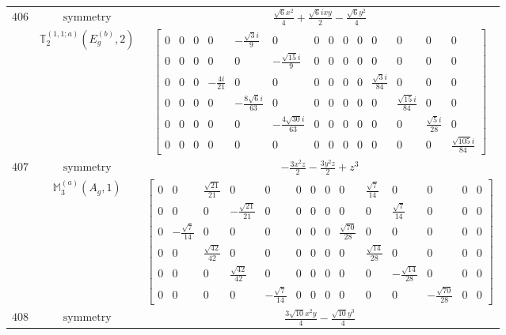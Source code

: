 \documentclass[fleqn,8pt,landscape]{jsarticle}
\begin{document}
\begin{longtable}{ccc}
$ 406 $ & $ \text{symmetry} $ & $ \frac{\sqrt{6} x^{2}}{4} + \frac{\sqrt{6} i x y}{2} - \frac{\sqrt{6} y^{2}}{4} $ \\
$  $ & $ \mathbb{T}_{2}^{(1,1;a)}(E_{g}^{(b)},2) $ & $ \begin{bmatrix} 0 & 0 & 0 & 0 & - \frac{\sqrt{3} i}{9} & 0 & 0 & 0 & 0 & 0 & 0 & 0 & 0 & 0 \\ 0 & 0 & 0 & 0 & 0 & - \frac{\sqrt{15} i}{9} & 0 & 0 & 0 & 0 & 0 & 0 & 0 & 0 \\ 0 & 0 & 0 & - \frac{4 i}{21} & 0 & 0 & 0 & 0 & 0 & 0 & \frac{\sqrt{3} i}{84} & 0 & 0 & 0 \\ 0 & 0 & 0 & 0 & - \frac{8 \sqrt{6} i}{63} & 0 & 0 & 0 & 0 & 0 & 0 & \frac{\sqrt{15} i}{84} & 0 & 0 \\ 0 & 0 & 0 & 0 & 0 & - \frac{4 \sqrt{30} i}{63} & 0 & 0 & 0 & 0 & 0 & 0 & \frac{\sqrt{5} i}{28} & 0 \\ 0 & 0 & 0 & 0 & 0 & 0 & 0 & 0 & 0 & 0 & 0 & 0 & 0 & \frac{\sqrt{105} i}{84} \end{bmatrix} $ \\ \hline
$ 407 $ & $ \text{symmetry} $ & $ - \frac{3 x^{2} z}{2} - \frac{3 y^{2} z}{2} + z^{3} $ \\
$  $ & $ \mathbb{M}_{3}^{(a)}(A_{g},1) $ & $ \begin{bmatrix} 0 & 0 & \frac{\sqrt{21}}{21} & 0 & 0 & 0 & 0 & 0 & 0 & \frac{\sqrt{7}}{14} & 0 & 0 & 0 & 0 \\ 0 & 0 & 0 & - \frac{\sqrt{21}}{21} & 0 & 0 & 0 & 0 & 0 & 0 & \frac{\sqrt{7}}{14} & 0 & 0 & 0 \\ 0 & - \frac{\sqrt{7}}{14} & 0 & 0 & 0 & 0 & 0 & 0 & \frac{\sqrt{70}}{28} & 0 & 0 & 0 & 0 & 0 \\ 0 & 0 & \frac{\sqrt{42}}{42} & 0 & 0 & 0 & 0 & 0 & 0 & \frac{\sqrt{14}}{28} & 0 & 0 & 0 & 0 \\ 0 & 0 & 0 & \frac{\sqrt{42}}{42} & 0 & 0 & 0 & 0 & 0 & 0 & - \frac{\sqrt{14}}{28} & 0 & 0 & 0 \\ 0 & 0 & 0 & 0 & - \frac{\sqrt{7}}{14} & 0 & 0 & 0 & 0 & 0 & 0 & - \frac{\sqrt{70}}{28} & 0 & 0 \end{bmatrix} $ \\ \hline
$ 408 $ & $ \text{symmetry} $ & $ \frac{3 \sqrt{10} x^{2} y}{4} - \frac{\sqrt{10} y^{3}}{4} $ \\

\end{longtable}
\end{document}
